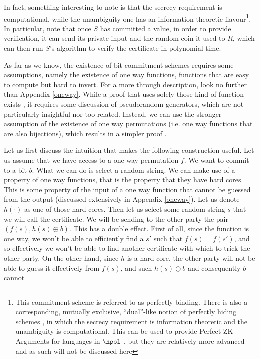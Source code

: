 \documentclass{article}
\begin{document}
In fact, something interesting to note is that the secrecy requirement is computational, while the unambiguity one has an information theoretic flavour\footnote{This commitment scheme is referred to as perfectly binding. There is also a corresponding, mutually exclusive, \enquote{dual}-like notion of perfectly hiding  schemes \cite{brassardMinimumDisclosureProofs1988}, in which the secrecy
    requirement is information theoretic and the unambiguity is computational. This can be used to provide Perfect ZK Arguments for
    languages in $\npol$ \cite{naorPerfectZeroKnowledgeArguments1998}, but they are relatively more advanced and as such will not be discussed here}.
In particular, note that once $S$ has committed a value, in order to provide verification, it can send its private input and the random coin it used to $R$, which can then
run $S$'s algorithm to verify the certificate in polynomial time. \par
As far as we know, the existence of bit commitment schemes requires some assumptions, namely the existence of one way functions, functions that are easy to compute but hard to invert.
For a more through description, look no further than Appendix \ref{oneway}.
While a proof that uses solely those kind of function exists \cite{naorBitCommitmentUsing}, it requires some discussion of pseudorandom generators, which are not particularly insightful nor too related.
Instead, we can use the stronger assumption of the existence of one way permutations (i.e. one way functions that are also bijections), which results in a simpler proof \cite{blummanuelCoinFlippingTelephone1983}.\par
Let us first discuss the intuition that makes the following construction useful. Let us assume that we have access to a one way permutation $f$.
We want to commit to a bit $b$. What we can do is select a random string. We can make use of a property of one way functions, that is the
property that they have hard cores. This is some property of the input of a one way function that cannot be guessed from the output (discussed extensively in Appendix \ref{oneway}).
Let us denote $h(\cdot)$ as one of those hard cores. Then let us select some random string $s$ that we will call the certificate. We will be sending to
the other party the pair $(f(s), h(s) \oplus b)$. This has a double effect. First of all, since the function is one way, we won't be able to
efficiently find a $s'$ such that $f(s) = f(s')$, and so effectively we won't be able to find another certificate with which to trick the other party.
On the other hand, since $h$ is a hard core, the other party will not be able to guess it effectively from $f(s)$, and such $h(s) \oplus b$ and consequently $b$ cannot
\end{document}
